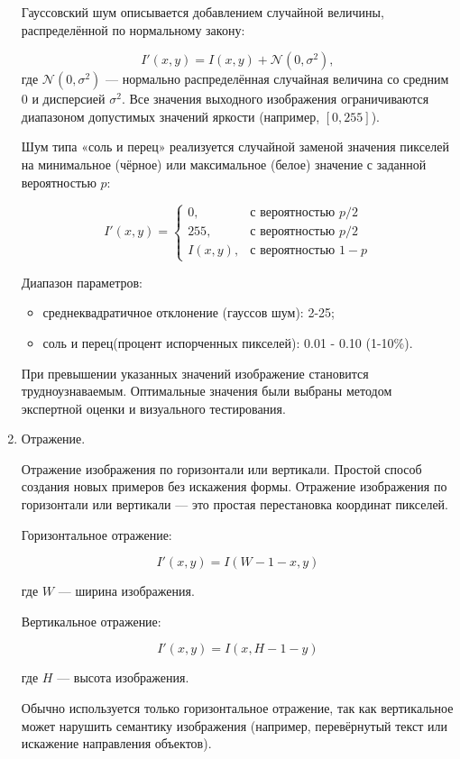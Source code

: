 \begin{enumerate}
Гауссовский шум описывается добавлением случайной величины, распределённой по нормальному закону:

\[
I'(x, y) = I(x, y) + \mathcal{N}(0, \sigma^2),
\]
где $\mathcal{N}(0, \sigma^2)$ — нормально распределённая случайная величина со средним $0$ и дисперсией $\sigma^2$. Все значения выходного изображения ограничиваются диапазоном допустимых значений яркости (например, $[0, 255]$).
	
Шум типа «соль и перец» реализуется случайной заменой значения пикселей на минимальное (чёрное) или максимальное (белое) значение с заданной вероятностью $p$:

\[
I'(x, y) =
\begin{cases}
	0, & \text{с вероятностью } p/2 \\
	255, & \text{с вероятностью } p/2 \\
	I(x, y), & \text{с вероятностью } 1 - p
\end{cases}
\]


Диапазон параметров:
\begin{itemize}
	\item среднеквадратичное отклонение (гауссов шум): 2-25;
	\item соль и перец(процент испорченных пикселей): 0.01 - 0.10 (1-10\%).
\end{itemize}

При превышении указанных значений изображение становится трудноузнаваемым. Оптимальные значения были выбраны методом экспертной оценки и визуального тестирования.


	\item Отражение.
	
Отражение изображения по горизонтали или вертикали. Простой способ создания новых примеров без искажения формы. Отражение изображения по горизонтали или вертикали — это простая перестановка координат пикселей.


Горизонтальное отражение:

\[
I'(x, y) = I(W - 1 - x, y)
\]

где $W$ — ширина изображения.
	
Вертикальное отражение:

\[
I'(x, y) = I(x, H - 1 - y)
\]

где $H$ — высота изображения.


Обычно используется только горизонтальное отражение, так как вертикальное может нарушить семантику изображения (например, перевёрнутый текст или искажение направления объектов). 


\end{enumerate}
